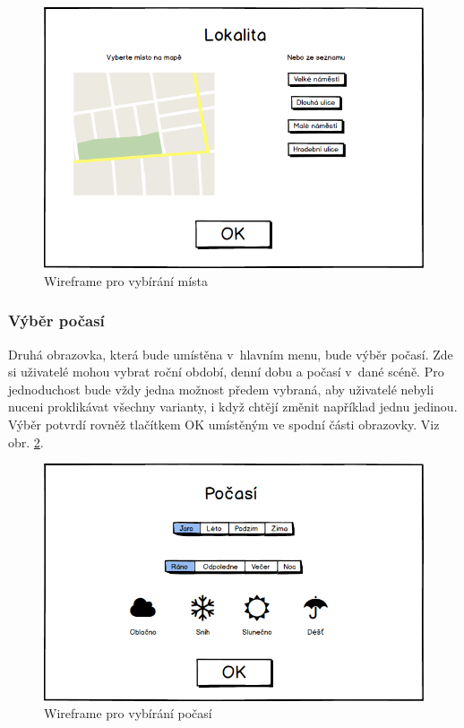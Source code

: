 \documentclass[thesis=B,czech]{FITthesis}[2012/06/26]
\begin{document}
	\begin{figure}
  		\includegraphics[width=\textwidth,height=\textheight,keepaspectratio]{MockMisto.png}
  		\caption{Wireframe pro vybírání místa}
  		\label{fig:mockMisto}
	\end{figure}
	
	\subsubsection{Výběr počasí}
Druhá obrazovka, která bude umístěna v~hlavním menu, bude výběr počasí. Zde si uživatelé mohou vybrat roční období, denní dobu a počasí v~dané scéně. Pro jednoduchost bude vždy jedna možnost předem vybraná, aby uživatelé nebyli nuceni proklikávat všechny varianty, i když chtějí změnit například jednu jedinou. Výběr potvrdí rovněž tlačítkem OK umístěným ve spodní části obrazovky. Viz obr. \ref{fig:mockPocasi}.
	
	\begin{figure}
  		\includegraphics[width=\textwidth,height=\textheight,keepaspectratio]{MockPocasi.png}
  		\caption{Wireframe pro vybírání počasí}
  		\label{fig:mockPocasi}
	\end{figure}
	
\end{document}
